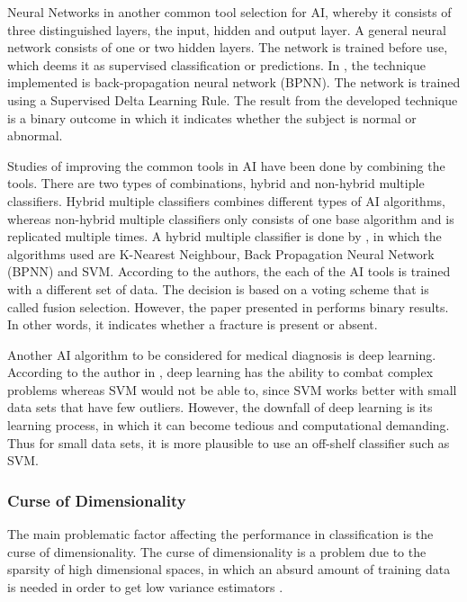 \documentclass[11pt,twocolumn]{witseiepaper}
\begin{document}
	Neural Networks in another common tool selection for AI, whereby it consists of three distinguished layers, the input, hidden and output layer. A general neural network consists of one or two hidden layers. The network is trained before use, which deems it as supervised classification or predictions. In \cite{jyothi_congenital_2016}, the technique implemented is back-propagation neural network (BPNN). The network is trained using a Supervised Delta Learning Rule. The result from the developed technique is a binary outcome in which it indicates whether the subject is normal or abnormal.
	
	Studies of improving the common tools in AI have been done by combining the tools. There are two types of combinations, hybrid and non-hybrid multiple classifiers. Hybrid multiple classifiers combines different types of AI algorithms, whereas non-hybrid multiple classifiers only consists of one base algorithm and is replicated multiple times. A hybrid multiple classifier is done by \cite{multiple_classification}, in which the algorithms used are K-Nearest Neighbour, Back Propagation Neural Network (BPNN) and SVM. According to the authors, the each of the AI tools is trained with a different set of data. The decision is based on a voting scheme that is called fusion selection. However, the paper presented in \cite{multiple_classification} performs binary results. In other words, it indicates whether a fracture is present or absent. 
	
	Another AI algorithm to be considered for medical diagnosis is deep learning. According to the author in \cite{LeCun2015}, deep learning has the ability to combat complex problems whereas SVM would not be able to, since SVM works better with small data sets that have few outliers. However, the downfall of deep learning is its learning process, in which it can become tedious and computational demanding. Thus for small data sets, it is more plausible to use an off-shelf classifier such as SVM. 
	
	\subsubsection{\textbf{Curse of Dimensionality}}
	The main problematic factor affecting the performance in classification is the curse of dimensionality. The curse of dimensionality is a problem due to the sparsity of high dimensional spaces, in which an absurd amount of training data is needed in order to get low variance  estimators \cite{intrator_feature_1992}.
	
\end{document}
